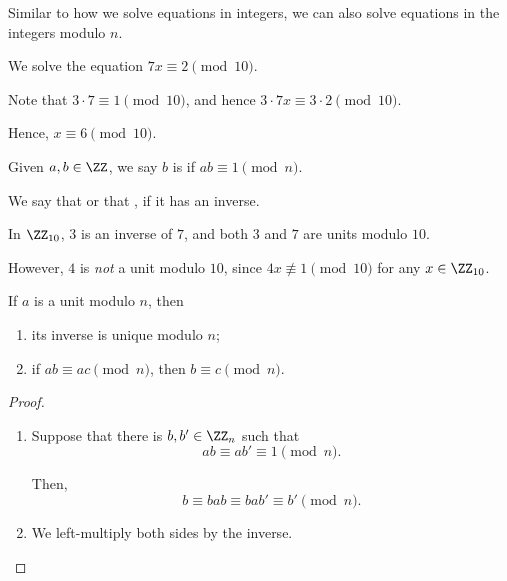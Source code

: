 Similar to how we solve equations in integers, we can also solve equations in the integers modulo \(n\).

\begin{example}
    We solve the equation \(7x \equiv 2 \pmod{10}\).

    Note that \(3 \cdot 7 \equiv 1 \pmod{10}\), and hence \(3 \cdot 7x \equiv 3 \cdot 2 \pmod{10}\).

    Hence, \(x \equiv 6 \pmod{10}\).
\end{example}

\begin{definition}
    Given \(a, b \in \ZZ\), we say \(b\) is  if \(ab \equiv 1 \pmod{n}\).

    We say that  or that , if it has an inverse.
\end{definition}

\begin{example}
    In \(\ZZ_{10}\), \(3\) is an inverse of \(7\), and both \(3\) and \(7\) are units modulo \(10\).

    However, \(4\) is \emph{not} a unit modulo \(10\), since \(4x \nequiv 1 \pmod{10}\) for any \(x \in \ZZ_{10}\).
\end{example}

\begin{proposition}
    If \(a\) is a unit modulo \(n\), then
    \begin{enumerate}
        \item its inverse is unique modulo \(n\);
        \item if \(ab \equiv ac \pmod{n}\), then \(b \equiv c \pmod{n}\).
    \end{enumerate}
\end{proposition}

\begin{proof}
    \begin{enumerate}
        \item Suppose that there is \(b, b' \in \ZZ_n\) such that
        \[
            ab \equiv ab' \equiv 1 \pmod{n}.
        \]

        Then,
        \[
            b \equiv bab \equiv bab' \equiv b' \pmod{n}.
        \]

        \item We left-multiply both sides by the inverse.
    \end{enumerate}
\end{proof}

